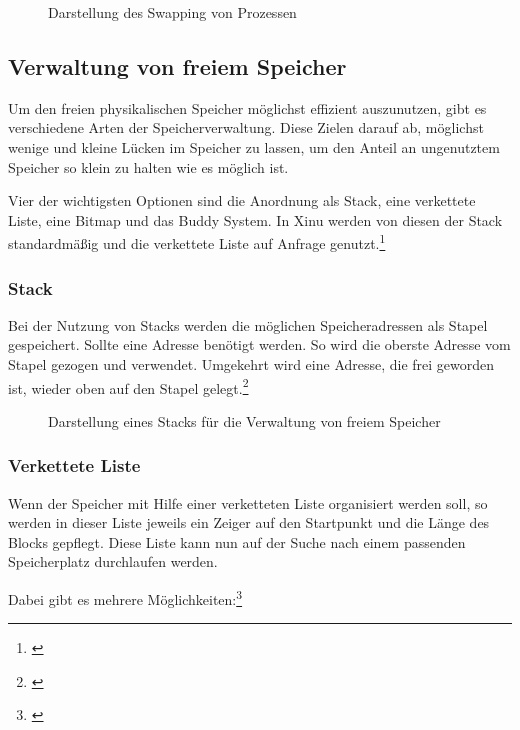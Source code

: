 \begin{figure}[htb]
	\centering
	\caption{Darstellung des Swapping von Prozessen}
\end{figure}

\subsection{Verwaltung von freiem Speicher}
\label{subsec:VerwaltungFreiemSpeicher}
Um den freien physikalischen Speicher möglichst effizient auszunutzen, gibt es verschiedene Arten der Speicherverwaltung. Diese Zielen darauf ab, möglichst wenige und kleine Lücken im Speicher zu lassen, um den Anteil an ungenutztem Speicher so klein zu halten wie es möglich ist.

Vier der wichtigsten Optionen sind die Anordnung als Stack, eine verkettete Liste, eine Bitmap und das Buddy System. In Xinu werden von diesen der Stack standardmäßig und die verkettete Liste auf Anfrage genutzt.\footnote{\cite[S.~157]{Comer.2015}}

\subsubsection{Stack}
Bei der Nutzung von Stacks werden die möglichen Speicheradressen als Stapel gespeichert. Sollte eine Adresse benötigt werden. So wird die oberste Adresse vom Stapel gezogen und verwendet. Umgekehrt wird eine Adresse, die frei geworden ist, wieder oben auf den Stapel gelegt.\footnote{\cite[S.~165]{Comer.2015}}

\begin{figure}[htb]
	\centering
	\caption{Darstellung eines Stacks für die Verwaltung von freiem Speicher}
\end{figure}

\subsubsection{Verkettete Liste}
Wenn der Speicher mit Hilfe einer verketteten Liste organisiert werden soll, so werden in dieser Liste jeweils ein Zeiger auf den Startpunkt und die Länge des Blocks gepflegt. Diese Liste kann nun auf der Suche nach einem passenden Speicherplatz durchlaufen werden. 

Dabei gibt es mehrere Möglichkeiten:\footnote{\cite[S.~250--251]{Tanenbaum.2016}}

